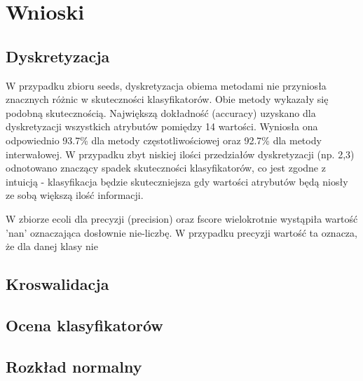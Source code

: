 \chapter{Wnioski}
\section{Dyskretyzacja}
W przypadku zbioru seeds, dyskretyzacja obiema metodami nie przyniosła znacznych różnic w skuteczności klasyfikatorów. Obie metody wykazały się podobną skutecznością. Największą dokładność (accuracy) uzyskano dla dyskretyzacji wszystkich atrybutów pomiędzy 14 wartości. Wyniosła ona odpowiednio 93.7\% dla metody częstotliwościowej oraz 92.7\% dla metody interwałowej. W przypadku zbyt niskiej ilości przedziałów dyskretyzacji (np. 2,3) odnotowano znaczący spadek skuteczności klasyfikatorów, co jest zgodne z intuicją - klasyfikacja będzie skuteczniejsza gdy wartości atrybutów będą niosły ze sobą większą ilość informacji.

W zbiorze ecoli dla precyzji (precision) oraz fscore wielokrotnie wystąpiła wartość 'nan' oznaczająca dosłownie nie-liczbę. W przypadku precyzji wartość ta oznacza, że dla danej klasy nie 
\section{Kroswalidacja}
\section{Ocena klasyfikatorów}
\section{Rozkład normalny}